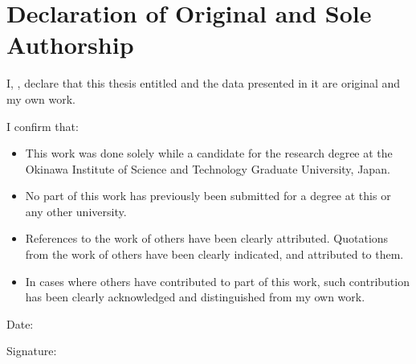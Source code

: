 \chapter*{Declaration of Original and Sole Authorship} 

I, \name, declare that this thesis entitled \emph{\thesistitle} and the data presented in it are original and my own work. 


I confirm that:
\begin{itemize}
\item This work was done solely while a candidate for the research degree at the Okinawa Institute of Science and Technology Graduate University, Japan.
\item No part of this work has previously been submitted for a degree at this or any other university.
\item References to the work of others have been clearly attributed. Quotations from the work of others have been clearly indicated, and attributed to them.
\item In cases where others have contributed to part of this work, such contribution has been clearly acknowledged and distinguished from my own work.
\end{itemize}

Date:  \submissiondate

Signature: 

